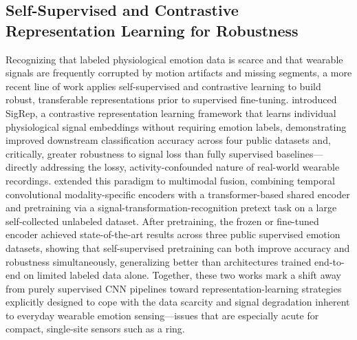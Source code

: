 \subsection{Self-Supervised and Contrastive Representation Learning for Robustness}
Recognizing that labeled physiological emotion data is scarce and that wearable signals are frequently corrupted by motion artifacts and missing segments, a more recent line of work applies self-supervised and contrastive learning to build robust, transferable representations prior to supervised fine-tuning. \cite{dissanayake2022sigrep} introduced SigRep, a contrastive representation learning framework that learns individual physiological signal embeddings without requiring emotion labels, demonstrating improved downstream classification accuracy across four public datasets and, critically, greater robustness to signal loss than fully supervised baselines---directly addressing the lossy, activity-confounded nature of real-world wearable recordings. \cite{wu2023transformer} extended this paradigm to multimodal fusion, combining temporal convolutional modality-specific encoders with a transformer-based shared encoder and pretraining via a signal-transformation-recognition pretext task on a large self-collected unlabeled dataset. After pretraining, the frozen or fine-tuned encoder achieved state-of-the-art results across three public supervised emotion datasets, showing that self-supervised pretraining can both improve accuracy and robustness simultaneously, generalizing better than architectures trained end-to-end on limited labeled data alone. Together, these two works mark a shift away from purely supervised CNN pipelines toward representation-learning strategies explicitly designed to cope with the data scarcity and signal degradation inherent to everyday wearable emotion sensing---issues that are especially acute for compact, single-site sensors such as a ring.

